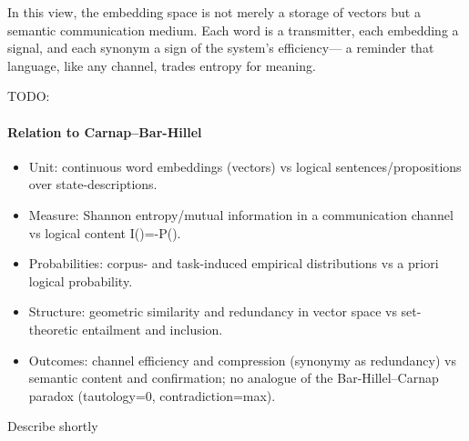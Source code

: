 \documentclass[12pt,a4paper]{article}
\begin{document}
\vspace{1em}

In this view, the embedding space is not merely a storage of vectors but a 
semantic communication medium.  
Each word is a transmitter, each embedding a signal, and each synonym a sign of the system's efficiency---  
a reminder that language, like any channel, trades entropy for meaning.

TODO:
\paragraph*{Relation to Carnap–Bar-Hillel}
\begin{itemize}
\item Unit: continuous word embeddings (vectors) vs logical sentences/propositions over state-descriptions.
\item Measure: Shannon entropy/mutual information in a communication channel vs logical content I(\varphi)=-\log P(\varphi).
\item Probabilities: corpus- and task-induced empirical distributions vs a priori logical probability.
\item Structure: geometric similarity and redundancy in vector space vs set-theoretic entailment and inclusion.
\item Outcomes: channel efficiency and compression (synonymy as redundancy) vs semantic content and confirmation; no analogue of the Bar-Hillel–Carnap paradox (tautology=0, contradiction=max).
\end{itemize}
Describe shortly 
\end{document}
